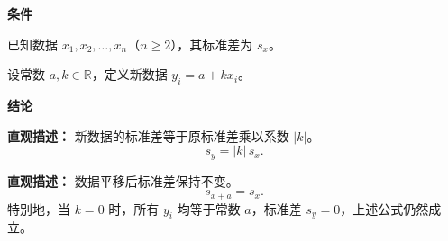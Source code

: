 \begin{statementbox}

	\textbf{\textcolor{CStatement}{条件}}
	\begin{description}[style=nextline, leftmargin=2.8em, labelsep=0.5em, itemsep=0.35em]
		\item[\textbf{\textcolor{CStatement}{条件1（原始数据条件）：}}] 已知数据 $x_1, x_2, \dots, x_n$（$n \ge 2$），其标准差为 $s_x$。
		\item[\textbf{\textcolor{CStatement}{条件2（线性变换形式）：}}] 设常数 $a, k \in \mathbb{R}$，定义新数据 $y_i = a + k x_i$。
	\end{description}

	\textbf{\textcolor{CStatement}{结论}}
	\begin{description}[style=nextline, leftmargin=2.8em, labelsep=0.5em, itemsep=0.45em]
		\item[\textbf{\textcolor{CStatement}{结论一（标准差变换公式）：}}]
			\textbf{\textcolor{CStatement}{直观描述：}}
			新数据的标准差等于原标准差乘以系数 $|k|$。
			\[
				s_y = |k|\,s_x .
			\]

		\item[\textbf{\textcolor{CStatement}{推广结论（平移不变性）：}}]
			\textbf{\textcolor{CStatement}{直观描述：}}
			数据平移后标准差保持不变。
			\[
				s_{x+a} = s_x .
			\]
			特别地，当 $k=0$ 时，所有 $y_i$ 均等于常数 $a$，标准差 $s_y = 0$，上述公式仍然成立。
	\end{description}

\end{statementbox}
